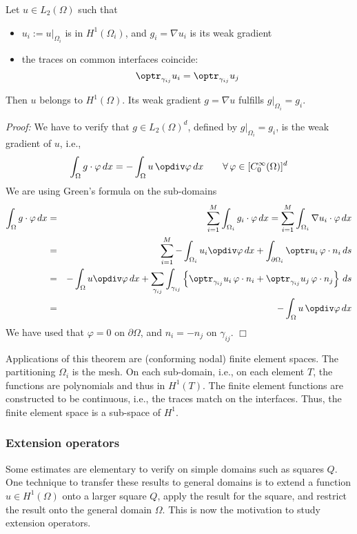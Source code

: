 \begin{theorem} \label{theo_subdomainh1}
Let $u \in L_2(\Omega)$ such that
\begin{itemize}
\item
$u_i := u|_{\Omega_i}$ is in $H^1(\Omega_i)$, and $g_i = \nabla u_i$ is its
weak gradient
\item
the traces on common interfaces coincide:
$$
\optr_{\gamma_{ij}} u_i = 
\optr_{\gamma_{ij}} u_j 
$$
\end{itemize}
Then $u$ belongs to $H^1(\Omega)$. Its weak gradient $g = \nabla u$ fulfills
$g|_{\Omega_i} = g_i$.
\end{theorem}
{\em Proof:} We have to verify that $g \in L_2(\Omega)^d$, defined by $g |_{\Omega_i} = g_i$,
is the weak gradient of $u$, i.e.,
$$
\int_\Omega g \cdot \varphi \, dx = - \int_\Omega u \, \opdiv \varphi \, dx
\qquad \forall \, \varphi \in [C_0^\infty(\Omega)]^d
$$
We are using Green's formula on the sub-domains
\begin{eqnarray*}
\int_\Omega g \cdot \varphi \, dx & = & 
        \sum_{i=1}^M \int_{\Omega_i} g_i \cdot \varphi \, dx =
        \sum_{i=1}^M \int_{\Omega_i} \nabla u_i \cdot \varphi \, dx \\
        & = & 
        \sum_{i=1}^M -\int_{\Omega_i} u_i  \opdiv \varphi \, dx 
           + \int_{\partial \Omega_i} \optr u_i \, \varphi \cdot n_i \, ds \\
        & = & -\int_\Omega u \opdiv \varphi \, dx 
        + \sum_{\gamma_{ij}} \int_{\gamma_{ij}} 
        \left\{ \optr_{\gamma_{ij}} u_i \, \varphi \cdot n_i +
                \optr_{\gamma_{ij}} u_j \, \varphi \cdot n_j
        \right\} \, ds \\
        & = & -\int_\Omega u \, \opdiv \varphi \, dx
\end{eqnarray*}
We have used that $\varphi = 0$ on $\partial \Omega$, and $n_i = -n_j$ on $\gamma_{ij}$.
\hfill $\Box$

\bigskip

Applications of this theorem are (conforming nodal) finite element
spaces. The partitioning $\Omega_i$ is the mesh. On each sub-domain,
i.e., on each element $T$, the functions are polynomials and thus in
$H^1(T)$. The finite element functions are constructed to be
continuous, i.e., the traces match on the interfaces. Thus, the finite
element space is a sub-space of $H^1$.

\subsubsection{Extension operators}
Some estimates are elementary to verify on simple domains such as squares $Q$. 
One technique to transfer these results to general domains is to extend 
a function $u \in H^1(\Omega)$ onto a larger square $Q$, apply the result 
for the  square, and restrict the result onto the general domain $\Omega$.
This is now the motivation to study extension operators.

